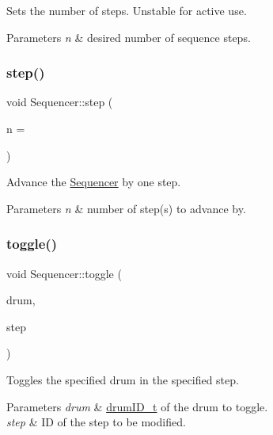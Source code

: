 Sets the number of steps. Unstable for active use. 
\begin{DoxyParams}{Parameters}
{\em n} & desired number of sequence steps. \\
\hline
\end{DoxyParams}
\mbox{\label{classdrumpi_1_1Sequencer_a86e0af4260c526be4646ce343830e6c4}} 
\subsubsection{\texorpdfstring{step()}{step()}}
{\footnotesize\ttfamily void Sequencer\+::step (\begin{DoxyParamCaption}\item[{int}]{n = {} }\end{DoxyParamCaption})}

Advance the \hyperlink{classdrumpi_1_1Sequencer}{Sequencer} by one step. 
\begin{DoxyParams}{Parameters}
{\em n} & number of step(s) to advance by. \\
\hline
\end{DoxyParams}
\mbox{\label{classdrumpi_1_1Sequencer_a2d7b85fe97bd2714632bd65135868897}} 
\subsubsection{\texorpdfstring{toggle()}{toggle()}\hspace{0.1cm}{\footnotesize\ttfamily [1/2]}}
{\footnotesize\ttfamily void Sequencer\+::toggle (\begin{DoxyParamCaption}\item[{\hyperlink{namespacedrumpi_a3897274035c1b939a604438abe648b1b}{drum\+I\+D\+\_\+t}}]{drum,  }\item[{int}]{step }\end{DoxyParamCaption})}

Toggles the specified drum in the specified step. 
\begin{DoxyParams}{Parameters}
{\em drum} & \hyperlink{namespacedrumpi_a3897274035c1b939a604438abe648b1b}{drum\+I\+D\+\_\+t} of the drum to toggle. \\
\hline
{\em step} & ID of the step to be modified. \\
\hline
\end{DoxyParams}
\mbox{\label{classdrumpi_1_1Sequencer_a7ca8d490e9eaf703c9f7e0594fa4090c}} 
